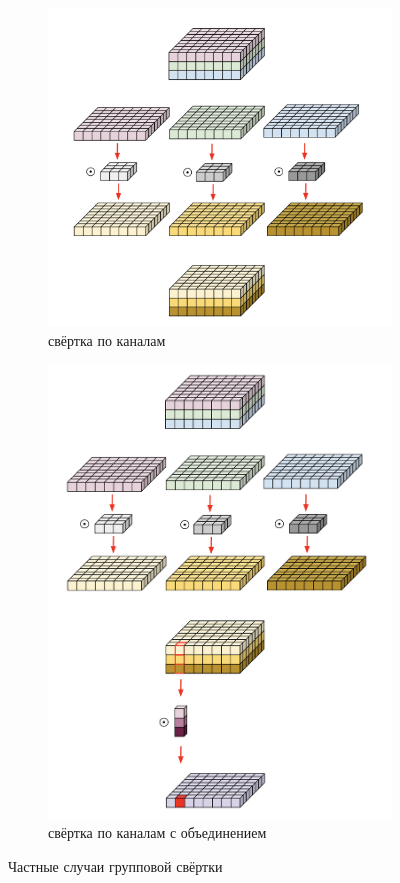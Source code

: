 \documentclass[12pt, fleqn]{article}
\begin{document}
\begin{enumerate}
        \begin{figure}[ht]
            \centering
            \begin{subfigure}[b]{0.45\textwidth}
                \includegraphics[width=0.7\linewidth]{pics/depth_conv.png}
                \vspace{2.0cm}
                \caption{свёртка по каналам}
            \end{subfigure}
            \begin{subfigure}[b]{0.45\textwidth}
                \includegraphics[width=0.7\linewidth]{pics/depth_sep_conv.png}
                \caption{свёртка по каналам с объединением}
            \end{subfigure}
            \caption{Частные случаи групповой свёртки \cite{depthwise_conv}}
            \label{depthwise_conv}
        \end{figure}

    \end{enumerate}
\end{document}
